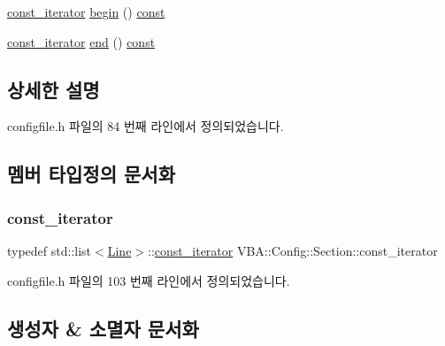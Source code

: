 \begin{DoxyCompactItemize}
\item 
\mbox{\hyperlink{class_v_b_a_1_1_config_1_1_section_a79d4303068448425b08175c0d2dacfab}{const\+\_\+iterator}} \mbox{\hyperlink{class_v_b_a_1_1_config_1_1_section_ac345183b43a45fd3eeaa646eac631390}{begin}} () \mbox{\hyperlink{getopt1_8c_a2c212835823e3c54a8ab6d95c652660e}{const}}
\item 
\mbox{\hyperlink{class_v_b_a_1_1_config_1_1_section_a79d4303068448425b08175c0d2dacfab}{const\+\_\+iterator}} \mbox{\hyperlink{class_v_b_a_1_1_config_1_1_section_a15ff15ecb9f7f3aa0bb1c218d47f8829}{end}} () \mbox{\hyperlink{getopt1_8c_a2c212835823e3c54a8ab6d95c652660e}{const}}
\end{DoxyCompactItemize}


\subsection{상세한 설명}


configfile.\+h 파일의 84 번째 라인에서 정의되었습니다.



\subsection{멤버 타입정의 문서화}
\mbox{\label{class_v_b_a_1_1_config_1_1_section_a79d4303068448425b08175c0d2dacfab}} 
\subsubsection{\texorpdfstring{const\+\_\+iterator}{const\_iterator}}
{\footnotesize\ttfamily typedef std\+::list$<$\mbox{\hyperlink{class_v_b_a_1_1_config_1_1_line}{Line}}$>$\+::\mbox{\hyperlink{class_v_b_a_1_1_config_1_1_section_a79d4303068448425b08175c0d2dacfab}{const\+\_\+iterator}} V\+B\+A\+::\+Config\+::\+Section\+::const\+\_\+iterator}



configfile.\+h 파일의 103 번째 라인에서 정의되었습니다.



\subsection{생성자 \& 소멸자 문서화}
\mbox{\label{class_v_b_a_1_1_config_1_1_section_af1a15ac7cc46f2738a702b7dcbf62de2}} 

